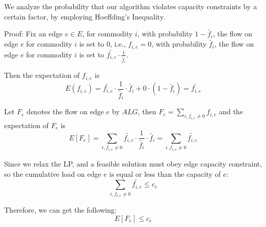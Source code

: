 \documentclass[conference]{IEEEtran}
\begin{document}
We analyze the probability that our algorithm violates capacity constraints by a certain factor, by employing Hoeffding's Inequality.

Proof: Fix an edge $e \in E$, for commodity $i$, with probability $1-\tilde{f_i}$, the flow on edge $e$ for commodity $i$ is set to 0, i.e., $f_{i,e}=0$, with probability $\tilde{f_i}$, the flow on edge $e$ for commodity $i$ is set to $\tilde{f_{i,e}} \cdot \frac{1}{\tilde{f_i}}$. 

Then the expectation of $f_{i,e}$ is 
\begin{equation}
E(f_{i,e}) = \tilde{f_{i,e}} \cdot \frac{1}{\tilde{f_i}} \cdot  \tilde{f_i}+ 0 \cdot (1-\tilde{f_i}) = \tilde{f_{i,e}}
\end{equation}

Let $F_e$ denotes the flow on edge $e$ by $ALG$, then $F_e = \sum_{i, f_{i,e} \neq 0}{f_{i,e}}$ and the expectation of $F_e$ is 
\begin{equation} \label{expect}
E[F_e] = \sum_{i, f_{i,e} \neq 0}\tilde{f_{i,e}} \cdot \frac{1}{\tilde{f_i}} \cdot  \tilde{f_i} = \sum_{i, f_{i,e} \neq 0}\tilde{f_{i,e}}
\end{equation}

Since we relax the LP, and a feasible solution must obey edge capacity constraint, so the cumulative load on edge $e$ is equal or less than the capacity of $e$:
\begin{equation}
\sum_{i, f_{i,e} \neq 0}\tilde{f_{i,e}} \le c_e
\end{equation}

Therefore, we can get the following:
\begin{equation} \label{equ:edgecap}
E[F_e] \le c_e
\end{equation}
\end{document}
